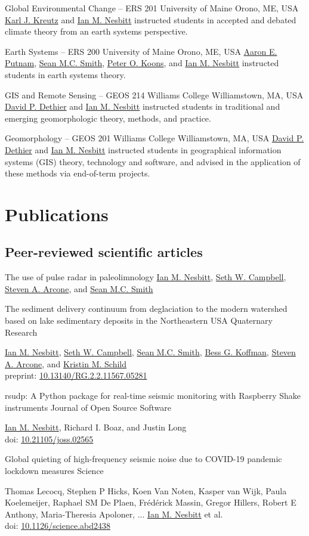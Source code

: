\documentclass[a4paper,12pt,sans,colorlinks]{moderncv}
\newcommand{\me}{\href{https://www.iannesbitt.org}{Ian M. Nesbitt}}
\newcommand{\seth}{\href{https://www.alpinesciences.net}{Seth W. Campbell}}
\newcommand{\sean}{\href{https://umaine.edu/earthclimate/people/sean-m-c-smith/}{Sean M.C. Smith}}
\newcommand{\bess}{\href{https://www.colby.edu/directory/profile/bess.koffman/}{Bess G. Koffman}}
\newcommand{\stevearcone}{\href{https://engineering.dartmouth.edu/community/faculty/steven-arcone}{Steven A. Arcone}}
\newcommand{\kristin}{\href{https://climatechange.umaine.edu/people/kristin-schild/}{Kristin M. Schild}}
\newcommand{\richard}{Richard I. Boaz}
\newcommand{\peter}{\href{https://umaine.edu/earthclimate/people/peter-koons/}{Peter O. Koons}}
\newcommand{\aaron}{\href{https://umaine.edu/earthclimate/people/aaron-putnam/}{Aaron E. Putnam}}
\newcommand{\karl}{\href{https://umaine.edu/earthclimate/people/karl-kreutz/}{Karl J. Kreutz}}
\newcommand{\david}{\href{https://geosciences.williams.edu/profile/ddethier/}{David P. Dethier}}
\newcommand{\doi}[1]{%
    \href{https://doi.org/#1}{#1}
}
\begin{document}
{Global Environmental Change -- ERS 201}
{University of Maine}
{Orono, ME, USA}
{}
{
    \karl{} and \me{} instructed students in accepted and
    debated climate theory from an earth systems perspective.
}

{Earth Systems -- ERS 200}
{University of Maine}
{Orono, ME, USA}
{}
{
    \aaron{}, \sean{}, \peter{}, and \me{} instructed students
    in earth systems theory.
}

{GIS and Remote Sensing -- GEOS 214}
{Williams College}
{Williamstown, MA, USA}
{}
{
    \david{} and \me{} instructed students in traditional and
    emerging geomorphologic theory, methods, and practice.
}

{Geomorphology -- GEOS 201}
{Williams College}
{Williamstown, MA, USA}
{}
{
    \david{} and \me{}
    instructed students in geographical information systems (GIS)
    theory, technology and software, and advised in the
    application of these methods via end-of-term projects.
}




\section{Publications}

\subsection{Peer-reviewed scientific articles}

{The use of pulse radar in paleolimnology}
{}
{}
{}
{
    \me{}, \seth{}, \stevearcone{}, and \sean{}
}

{The sediment delivery continuum from deglaciation to the modern
watershed based on lake sedimentary deposits in the Northeastern
USA}
{Quaternary Research}
{}
{}
{
    \me{}, \seth{}, \sean{}, \bess{}, \stevearcone{},
    and \kristin{}
    \\
    preprint: \doi{10.13140/RG.2.2.11567.05281}
}

{rsudp: A Python package for real-time seismic
monitoring with Raspberry Shake instruments}
{Journal of Open Source Software}
{}
{}
{
    \me{}, \richard, and Justin Long
    \\
    doi: \doi{10.21105/joss.02565}
}

{Global quieting of high-frequency seismic noise
due to COVID-19 pandemic lockdown measures}
{Science}
{}
{}
{
    Thomas Lecocq, Stephen P Hicks, Koen Van Noten,
    Kasper van Wijk, Paula Koelemeijer, Raphael SM De Plaen,
    Frédérick Massin, Gregor Hillers, Robert E Anthony,
    Maria-Theresia Apoloner, ... \me{} et al.
    \\
    doi: \doi{10.1126/science.abd2438}
}
\end{document}
